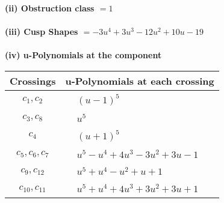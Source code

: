 \documentclass[1p]{elsarticle_modified}
\theoremstyle{definition}
\begin{document}
\flushleft \textbf{(ii) Obstruction class $= 1$}\\~\\
\flushleft \textbf{(iii) Cusp Shapes $= -3 u^4+3 u^3-12 u^2+10 u-19$}\\~\\
\newpage\renewcommand{\arraystretch}{1}
\flushleft \textbf{(iv) u-Polynomials at the component}\newline \\
\begin{tabular}{m{50pt}|m{274pt}}
Crossings & \hspace{64pt}u-Polynomials at each crossing \\
\hline $$\begin{aligned}c_{1},c_{2}\end{aligned}$$&$\begin{aligned}
&(u-1)^5
\end{aligned}$\\
\hline $$\begin{aligned}c_{3},c_{8}\end{aligned}$$&$\begin{aligned}
&u^5
\end{aligned}$\\
\hline $$\begin{aligned}c_{4}\end{aligned}$$&$\begin{aligned}
&(u+1)^5
\end{aligned}$\\
\hline $$\begin{aligned}c_{5},c_{6},c_{7}\end{aligned}$$&$\begin{aligned}
&u^5- u^4+4 u^3-3 u^2+3 u-1
\end{aligned}$\\
\hline $$\begin{aligned}c_{9},c_{12}\end{aligned}$$&$\begin{aligned}
&u^5+u^4- u^2+u+1
\end{aligned}$\\
\hline $$\begin{aligned}c_{10},c_{11}\end{aligned}$$&$\begin{aligned}
&u^5+u^4+4 u^3+3 u^2+3 u+1
\end{aligned}$\\
\hline
\end{tabular}\\~\\
\end{document}
